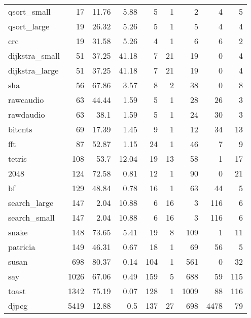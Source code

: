 \begin{tabular}{lrrrrrrrr}
\hline
 qsort\_small    &       17 &    11.76 &   5.88 &    5 &    1 &      2 &     4 &     5 \\
 qsort\_large    &       19 &    26.32 &   5.26 &    5 &    1 &      5 &     4 &     4 \\
 crc            &       19 &    31.58 &   5.26 &    4 &    1 &      6 &     6 &     2 \\
 dijkstra\_small &       51 &    37.25 &  41.18 &    7 &   21 &     19 &     0 &     4 \\
 dijkstra\_large &       51 &    37.25 &  41.18 &    7 &   21 &     19 &     0 &     4 \\
 sha            &       56 &    67.86 &   3.57 &    8 &    2 &     38 &     0 &     8 \\
 rawcaudio      &       63 &    44.44 &   1.59 &    5 &    1 &     28 &    26 &     3 \\
 rawdaudio      &       63 &    38.1  &   1.59 &    5 &    1 &     24 &    30 &     3 \\
 bitcnts        &       69 &    17.39 &   1.45 &    9 &    1 &     12 &    34 &    13 \\
 fft            &       87 &    52.87 &   1.15 &   24 &    1 &     46 &     7 &     9 \\
 tetris         &      108 &    53.7  &  12.04 &   19 &   13 &     58 &     1 &    17 \\
 2048           &      124 &    72.58 &   0.81 &   12 &    1 &     90 &     0 &    21 \\
 bf             &      129 &    48.84 &   0.78 &   16 &    1 &     63 &    44 &     5 \\
 search\_large   &      147 &     2.04 &  10.88 &    6 &   16 &      3 &   116 &     6 \\
 search\_small   &      147 &     2.04 &  10.88 &    6 &   16 &      3 &   116 &     6 \\
 snake          &      148 &    73.65 &   5.41 &   19 &    8 &    109 &     1 &    11 \\
 patricia       &      149 &    46.31 &   0.67 &   18 &    1 &     69 &    56 &     5 \\
 susan          &      698 &    80.37 &   0.14 &  104 &    1 &    561 &     0 &    32 \\
 say            &     1026 &    67.06 &   0.49 &  159 &    5 &    688 &    59 &   115 \\
 toast          &     1342 &    75.19 &   0.07 &  128 &    1 &   1009 &    88 &   116 \\
 djpeg          &     5419 &    12.88 &   0.5  &  137 &   27 &    698 &  4478 &    79 \\

\end{tabular}
